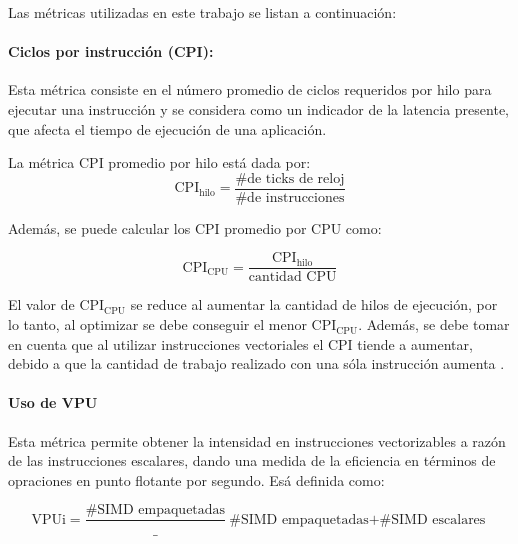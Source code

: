 Las métricas utilizadas en este trabajo se listan a continuación:

\paragraph*{Ciclos por instrucción (CPI):}

Esta métrica consiste en el número promedio de ciclos requeridos por hilo para ejecutar una instrucción y se considera como un indicador de la latencia presente, que afecta el tiempo de ejecución de una aplicación.

La métrica CPI promedio por hilo está dada por:
\begin{equation}\label{eq:CPI_metric}
\text{CPI}_{\text{hilo}} = \frac{\text{\# de ticks de reloj}}{\# \text{de instrucciones}}
\end{equation}

Además, se puede calcular los CPI promedio por CPU como:

\begin{equation}\label{eq:CPIc_metric}
\text{CPI}_{\text{CPU}} = \frac{\text{CPI}_{\text{hilo}}}{\text{cantidad CPU}}
\end{equation}

El valor de $\text{CPI}_{\text{CPU}} $ se reduce al aumentar la cantidad de hilos de ejecución, por lo tanto, al optimizar se debe conseguir el menor $\text{CPI}_{\text{CPU}} $. Además, se debe tomar en cuenta que al utilizar instrucciones vectoriales el CPI tiende a aumentar, debido a que la cantidad de trabajo realizado con una sóla instrucción aumenta \cite{Jeffers2016315}.

\paragraph*{Uso de VPU}

Esta métrica permite obtener la intensidad en instrucciones vectorizables a razón de las instrucciones escalares, dando una medida de la eficiencia en términos de opraciones en punto flotante por segundo\cite{Jeffers2016315}. Esá definida como:

\begin{equation}
\textrm{VPUi}= \frac{\textrm{\# SIMD empaquetadas}}_{\textrm{\# SIMD empaquetadas}+\textrm{\# SIMD escalares}}
\end{equation}
